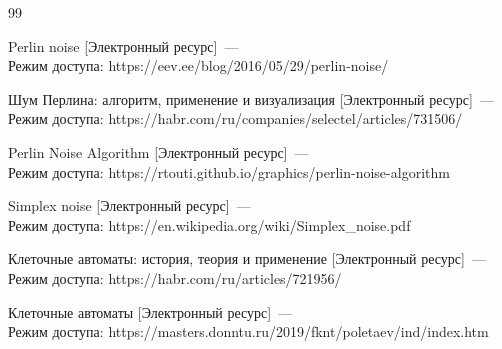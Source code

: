 \begin{thebibliography}{99}

 Perlin noise [Электронный ресурс]~--- \\Режим доступа: https://eev.ee/blog/2016/05/29/perlin-noise/

 Шум Перлина: алгоритм, применение и визуализация [Электронный ресурс]~--- \\Режим доступа: https://habr.com/ru/companies/selectel/articles/731506/

 Perlin Noise Algorithm [Электронный ресурс]~--- \\Режим доступа: https://rtouti.github.io/graphics/perlin-noise-algorithm

 Simplex noise [Электронный ресурс]~--- \\Режим доступа: https://en.wikipedia.org/wiki/Simplex_noise.pdf

 Клеточные автоматы: история, теория и применение [Электронный ресурс]~--- \\Режим доступа: https://habr.com/ru/articles/721956/

 Клеточные автоматы [Электронный ресурс]~--- \\Режим доступа: https://masters.donntu.ru/2019/fknt/poletaev/ind/index.htm

\end{thebibliography}
